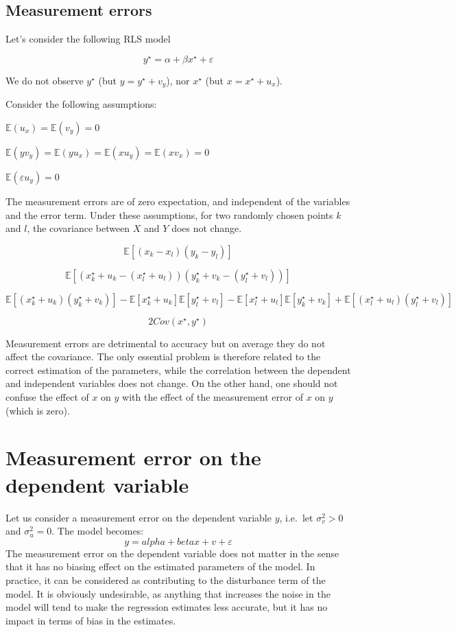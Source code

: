 \documentclass[
]{report}
\begin{document}
\hypertarget{measurement-errors}{%
\subsection{Measurement errors}\label{measurement-errors}}

Let's consider the following RLS model

\[y^{\star}=\alpha+\beta x^{\star}+\varepsilon\]

We do not observe \(y^{\star}\) (but \(y=y^{\star}+v_y\)), nor \(x^{\star}\) (but \(x=x^{\star}+u_x\)).

Consider the following assumptions:

\(\mathbb{E}(u_x)=\mathbb{E}(v_y)=0\)

\(\mathbb{E}(y v_y)=\mathbb{E}(y u_x)=\mathbb{E}(x u_y)=\mathbb{E}(x v_x)=0\)

\(\mathbb{E}(\varepsilon u_y)=0\)

The measurement errors are of zero expectation, and independent of the variables and the error term.
Under these assumptions, for two randomly chosen points \(k\) and \(l\), the covariance between \(X\) and \(Y\) does not change.

\[\mathbb{E}[(x_k-x_l)(y_k-y_l)]\]

\[\mathbb{E}[(x_k^{\star}+u_k-(x_l^{\star}+u_l))(y_k^{\star}+v_k-(y_l^{\star}+v_l))]\]

\[\mathbb{E}[(x_k^{\star}+u_k)(y_k^{\star}+v_k)] -\mathbb{E}[x_k^{\star}+u_k]\mathbb{E}[y_l^{\star}+v_l] -\mathbb{E}[x_l^{\star}+u_l]\mathbb{E}[y_k^{\star}+v_k]+ \mathbb{E}[(x_l^{\star}+u_l)(y_l^{\star}+v_l)]\]

\[2Cov(x^{\star},y^{\star})\]

Measurement errors are detrimental to accuracy but on average they do not affect the covariance. The only essential problem is therefore related to the correct estimation of the parameters, while the correlation between the dependent and independent variables does not change. On the other hand, one should not confuse the effect of \(x\) on \(y\) with the effect of the measurement error of \(x\) on \(y\) (which is zero).

\hypertarget{measurement-error-on-the-dependent-variable}{%
\section{Measurement error on the dependent variable}\label{measurement-error-on-the-dependent-variable}}

Let us consider a measurement error on the dependent variable \(y\), i.e.~let \(\sigma_v^2 > 0\) and \(\sigma_u^2 = 0\). The model becomes:
\[y=alpha+beta x + v+ \varepsilon\]
The measurement error on the dependent variable does not matter in the sense that it has no biasing effect on the estimated parameters of the model. In practice, it can be considered as contributing to the disturbance term of the model. It is obviously undesirable, as anything that increases the noise in the model will tend to make the regression estimates less accurate, but it has no impact in terms of bias in the estimates.
\end{document}
